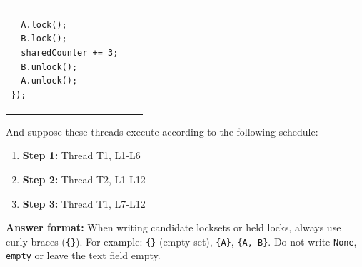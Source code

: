 \documentclass[addpoints]{exam}
\begin{document}
\begin{questions}
\begin{tabular}{p{.45\linewidth}|cp{.45\linewidth}}
\begin{verbatim}
  A.lock();
  B.lock();
  sharedCounter += 3;
  B.unlock();
  A.unlock();
});
\end{verbatim}
  \end{tabular}

  And suppose these threads execute according to the following schedule:
  \begin{enumerate}
  \item \textbf{Step 1:} Thread T1, L1-L6
  \item \textbf{Step 2:} Thread T2, L1-L12
  \item \textbf{Step 3:} Thread T1, L7-L12
  \end{enumerate}
\textbf{Answer format:} When writing candidate locksets or held locks, always use curly braces
(\texttt{\{\}}).
For example: \texttt{\{\}} (empty set), \texttt{\{A\}}, \texttt{\{A, B\}}. Do not write \texttt{None}, \texttt{empty} or leave the text field empty.

\end{questions}
\end{document}
